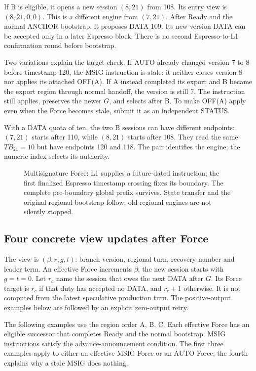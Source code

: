 \documentclass[11pt,a4paper]{article}
\newcommand{\TB}{\mathit{TB}}
\begin{document}
If B is eligible, it opens a new session $(8,21)$ from 108. Its entry
view is $(8,21,0,0)$. This is a different engine from $(7,21)$.
After Ready and the normal ANCHOR bootstrap, it proposes DATA 109.
Its new-version DATA can be accepted only in a later Espresso block.
There is no second Espresso-to-L1 confirmation round before bootstrap.

Two variations explain the target check. If AUTO already changed
version 7 to 8 before timestamp 120, the MSIG instruction is stale:
it neither closes version 8 nor applies its attached OFF(A). If A
instead completed its export and B became the export region through
normal handoff, the version is still 7. The instruction still applies,
preserves the newer $G$, and selects after B. To make OFF(A) apply even
when the Force becomes stale, submit it as an independent STATUS.

With a DATA quota of ten, the two B sessions can have different
endpoints: $(7,21)$ starts after 110, while $(8,21)$ starts after 108.
They read the same $\TB_{21}=10$ but have endpoints 120 and 118.
The pair identifies the engine; the numeric index selects its authority.

\begin{figure}[htbp]\centering

\caption{Multisignature Force: L1 supplies a future-dated instruction;
the first finalized Espresso timestamp crossing fixes its boundary.
The complete pre-boundary global prefix survives. State transfer and
the original regional bootstrap follow; old regional engines are not
silently stopped.}
\label{fig:forced-cross-region}
\end{figure}

\FloatBarrier
\subsection{Four concrete view updates after Force}
\label{sec:force-view-examples}
The view is $(\beta,r,g,t)$: branch version, regional turn,
recovery number and leader term. An effective Force increments $\beta$;
the new session starts with $g=t=0$. Let $r_c$ name the session that
owes the next DATA after $G$. Its Force target is $r_c$ if that duty
has accepted no DATA, and $r_c+1$ otherwise. It is not computed from
the latest speculative production turn. The positive-output examples
below are followed by an explicit zero-output retry.

The following examples use the region order A, B, C. Each effective
Force has an eligible successor that completes Ready and the normal
bootstrap. MSIG instructions satisfy the advance-announcement condition.
The first three examples apply to either an effective MSIG Force or
an AUTO Force; the fourth explains why a stale MSIG does nothing.
\end{document}
